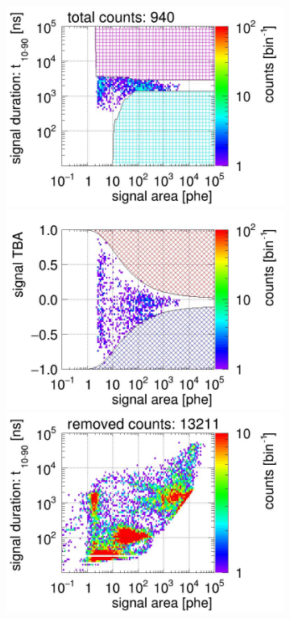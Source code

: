 \begin{landscape}
\begin{figure}[!p]
\begin{subfigure}[t]{0.32\textwidth}
			\includegraphics[width=\figurewidth,clip,trim={0 98 0 15}]{Figures/GasTest/CutsValid/res64850/pdpa23Vecfig64850.jpg}
			\includegraphics[width=\figurewidth,clip,trim={0 98 0 40}]{Figures/GasTest/CutsValid/res64850/tbapa23Vecfig64850.jpg}
			\includegraphics[width=\figurewidth,clip,trim={0 98 0 15}]{Figures/GasTest/CutsValid/res64850/pdpaX23Vecfig64850.jpg}

\end{subfigure}
\end{figure}
\end{landscape}

